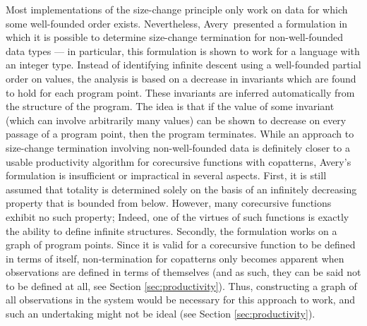 Most implementations of the size-change principle only work on data for which some well-founded order exists. Nevertheless, Avery\,\citep{Avery06} presented a formulation in which it is possible to determine size-change termination for non-well-founded data types --- in particular, this formulation is shown to work for a language with an integer type. Instead of identifying infinite descent using a well-founded partial order on values, the analysis is based on a decrease in invariants which are found to hold for each program point. These invariants are inferred automatically from the structure of the program. The idea is that if the value of some invariant (which can involve arbitrarily many values) can be shown to decrease on every passage of a program point, then the program terminates. While an approach to size-change termination involving non-well-founded data is definitely closer to a usable productivity algorithm for corecursive functions with copatterns, Avery's formulation is insufficient or impractical in several aspects. First, it is still assumed that totality is determined solely on the basis of an infinitely decreasing property that is bounded from below. However, many corecursive functions exhibit no such property; Indeed, one of the virtues of such functions is exactly the ability to define infinite structures. Secondly, the formulation works on a graph of program points. Since it is valid for a corecursive function to be defined in terms of itself, non-termination for copatterns only becomes apparent when observations are defined in terms of themselves (and as such, they can be said not to be defined at all, see Section \ref{sec:productivity}). Thus, constructing a graph of all observations in the system would be necessary for this approach to work, and such an undertaking might not be ideal (see Section \ref{sec:productivity}).


